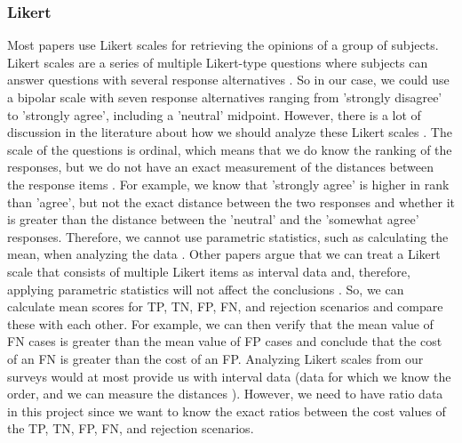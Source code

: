\documentclass[a4paper]{article}
\begin{document}
\subsubsection{Likert}
\label{sec:likert}
Most papers use Likert scales for retrieving the opinions of a group of subjects. Likert scales are a series of multiple Likert-type questions where subjects can answer questions with several response alternatives \cite{boone2012analyzing}. So in our case, we could use a bipolar scale with seven response alternatives ranging from 'strongly disagree' to 'strongly agree', including a 'neutral' midpoint. However, there is a lot of discussion in the literature about how we should analyze these Likert scales \cite{boone2012analyzing, allen2007likert, norman2010likert, murray2013likert}. The scale of the questions is ordinal, which means that we do know the ranking of the responses, but we do not have an exact measurement of the distances between the response items \cite{allen2007likert}. For example, we know that 'strongly agree' is higher in rank than 'agree', but not the exact distance between the two responses and whether it is greater than the distance between the 'neutral' and the 'somewhat agree' responses. Therefore, we cannot use parametric statistics, such as calculating the mean, when analyzing the data \cite{allen2007likert}. Other papers argue that we can treat a Likert scale that consists of multiple Likert items as interval data and, therefore, applying parametric statistics will not affect the conclusions \cite{boone2012analyzing, norman2010likert, murray2013likert}. So, we can calculate mean scores for TP, TN, FP, FN, and rejection scenarios and compare these with each other. For example, we can then verify that the mean value of FN cases is greater than the mean value of FP cases and conclude that the cost of an FN is greater than the cost of an FP. Analyzing Likert scales from our surveys would at most provide us with interval data (data for which we know the order, and we can measure the distances \cite{allen2007likert}). However, we need to have ratio data in this project since we want to know the exact ratios between the cost values of the TP, TN, FP, FN, and rejection scenarios.
\end{document}
